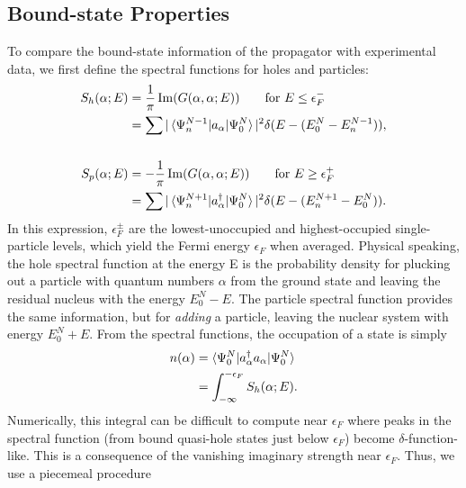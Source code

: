\subsection{Bound-state Properties}
To compare the bound-state information of the propagator with experimental data, we first
define the spectral functions for holes and particles:
\begin{equation}
    \begin{split}
        S_{h}(\alpha; E) & =
        \frac{1}{\pi}\operatorname{Im}({G(\alpha,\alpha;E)})\qquad \text{for } E\leq\epsilon_{F}^{-}\\
        & = \sum|\braket{\Psi^{N-1}_{n}|a_{\alpha}|\Psi^{N}_{0}}|^{2}
        \delta(E-(E^{N}_{0}-E_{n}^{N-1})),\\
        \\
        S_{p}(\alpha; E) & =
        -\frac{1}{\pi}\operatorname{Im}({G(\alpha,\alpha;E)})\qquad \text{for } E\geq\epsilon_{F}^{+}\\
        & = \sum|\braket{\Psi^{N+1}_{n}|a_{\alpha}^{\dagger}|\Psi^{N}_{0}}|^{2}
        \delta(E-(E_{n}^{N+1}-E^{N}_{0})).
    \end{split}
\end{equation}
In this expression, $\epsilon_{F}^{\pm}$ are the lowest-unoccupied and highest-occupied
single-particle levels, which yield the Fermi energy $\epsilon_{F}$ when averaged. Physical
speaking, the hole spectral function at the energy E is the probability density for plucking out
a particle with quantum numbers $\alpha$ from the ground state and leaving the residual nucleus with the
energy $E^{N}_{0}-E$. The particle spectral function provides the same
information, but for \textit{adding} a
particle, leaving the nuclear system with energy $E^{N}_{0}+E$. From the spectral functions, the occupation of a state is simply
\begin{equation} \label{ParticleNumber}
    \begin{split}
        n(\alpha) & = \braket{\Psi^{N}_{0}|a_{\alpha}^{\dagger}a_{\alpha}|\Psi^{N}_{0}}\\
        & = \int_{-\infty}^{-\epsilon_{F}}S_{h}(\alpha; E).
    \end{split}
\end{equation}
Numerically, this integral can be difficult to compute near $\epsilon_{F}$ where peaks in the
spectral function (from bound quasi-hole states just below $\epsilon_{F}$) become $\delta$-function-like. 
This is a consequence of the vanishing imaginary strength near $\epsilon_{F}$. Thus, we use a piecemeal procedure
